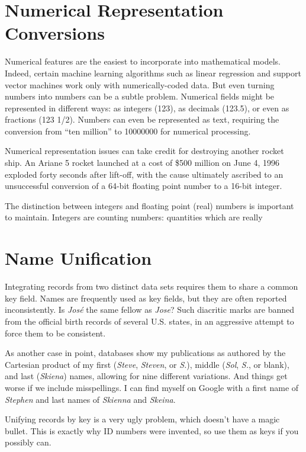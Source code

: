 \documentclass[10pt]{article}
\begin{document}
\section{Numerical Representation Conversions}
Numerical features are the easiest to incorporate into mathematical models. Indeed, certain machine learning algorithms such as linear regression and support vector machines work only with numerically-coded data. But even turning numbers into numbers can be a subtle problem. Numerical fields might be represented in different ways: as integers (123), as decimals (123.5), or even as fractions (123 1/2). Numbers can even be represented as text, requiring the conversion from ``ten million'' to 10000000 for numerical processing.

Numerical representation issues can take credit for destroying another rocket ship. An Ariane 5 rocket launched at a cost of \$500 million on June 4, 1996 exploded forty seconds after lift-off, with the cause ultimately ascribed to an unsuccessful conversion of a 64-bit floating point number to a 16-bit integer.

The distinction between integers and floating point (real) numbers is important to maintain. Integers are counting numbers: quantities which are really

\section*{Name Unification}

Integrating records from two distinct data sets requires them to share a common key field. Names are frequently used as key fields, but they are often reported inconsistently. Is \textit{José} the same fellow as \textit{Jose}? Such diacritic marks are banned from the official birth records of several U.S. states, in an aggressive attempt to force them to be consistent.

As another case in point, databases show my publications as authored by the Cartesian product of my first (\textit{Steve}, \textit{Steven}, or \textit{S.}), middle (\textit{Sol}, \textit{S.}, or blank), and last (\textit{Skiena}) names, allowing for nine different variations. And things get worse if we include misspellings. I can find myself on Google with a first name of \textit{Stephen} and last names of \textit{Skienna} and \textit{Skeina}.

Unifying records by key is a very ugly problem, which doesn't have a magic bullet. This is exactly why ID numbers were invented, so use them as keys if you possibly can.
\end{document}
